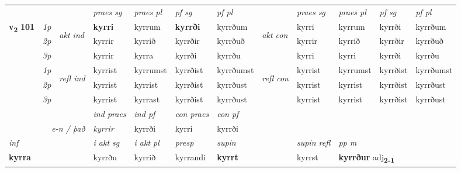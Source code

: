 \begin{longtable}[l]{X>{\footnotesize\itshape}llXXXXlXXXX}
 & &   & \textit{praes sg}  & \textit{praes pl}    & \textit{ pf sg} & \textit{pf pl} & & \textit{praes sg}  & \textit{praes pl}    & \textit{pf sg} & \textit{pf pl }  \\ \cmidrule{4-7} \cmidrule{9-12}
 \multirow{2}{*}{{{\textbf{v{\textsubscript{2}}} \Large{\textbf{101}}}}}  & 1p & \multirow{3}{*}{\begin{turn}{90}\textit{akt ind}\end{turn}} & \textbf{kyrri} & kyrrum & \textbf{kyrrði} & kyrrðum & \multirow{3}{*}{\begin{turn}{90}\textit{akt con}\end{turn}} &kyrri & kyrrum & kyrrði & kyrrðum\\*
 & 2p &  &  kyrrir  & kyrrið & kyrrðir & kyrrðuð & & kyrrir & kyrrið & kyrrðir & kyrrðuð \\*
 & 3p &  & kyrrir & kyrra & kyrrði & kyrrðu & & kyrri & kyrri& kyrrði & kyrrðu \\*
\cmidrule{4-7} \cmidrule{9-12}
 & 1p & \multirow{3}{*}{\begin{turn}{90}\textit{refl ind}\end{turn}}  & kyrrist & kyrrumst & kyrrðist & kyrrðumst & \multirow{3}{*}{\begin{turn}{90}\textit{refl con}\end{turn}}  &kyrrist & kyrrumst & kyrrðist & kyrrðumst \\*
 & 2p &  & kyrrist & kyrrist & kyrrðist & kyrrðust & &kyrrist & kyrrist & kyrrðist & kyrrðust \\*
 & 3p  & & kyrrist & kyrrast & kyrrðist & kyrrðust & & kyrrist & kyrrist& kyrrðist & kyrrðust \\*
\cmidrule{4-7} \cmidrule{9-12}

   && &  \textit{ind praes} & \textit{ind pf} & \textit{con praes} & \textit{con pf} \\*
\multicolumn{3}{r}{\textit{e-n / það}} & kyrrir & kyrrði & kyrri & kyrrði \\*

\cmidrule{4-7}
   {\textit{inf}} & &  & \textit{i akt sg} & \textit{i akt pl}   & \textit{presp} & \textit{supin} && \textit{supin refl} & \textit{pp m} \\*
  {\textbf{kyrra}} & && kyrrðu  & kyrrið   & kyrrandi &  \textbf{kyrrt} && kyrrst & \multicolumn{2}{l}{\textbf{kyrrður} adj\textbf{\textsubscript{2-1}}} \\*

\midrule


\end{longtable}
